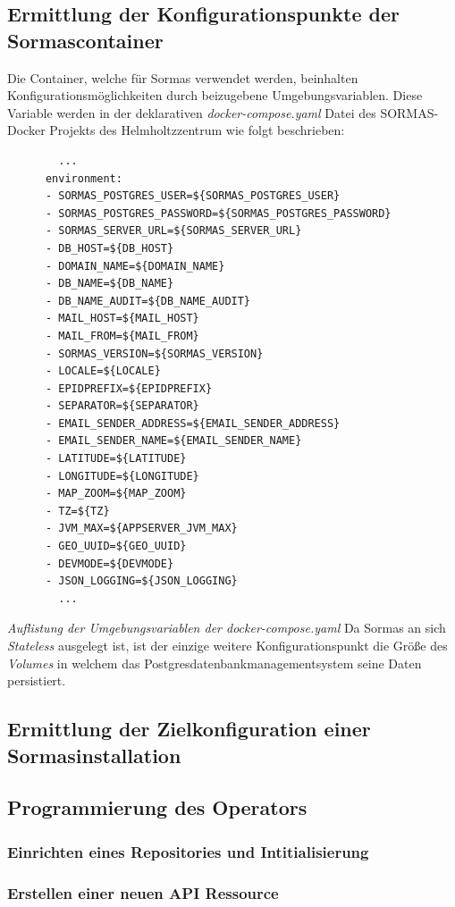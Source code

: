 \documentclass[a4paper,11pt]{article}
\begin{document}
    \subsection{Ermittlung der Konfigurationspunkte der Sormascontainer}
    Die Container, welche für Sormas verwendet werden, beinhalten Konfigurationsmöglichkeiten durch beizugebene Umgebungsvariablen.
    Diese Variable werden in der deklarativen \emph{docker-compose.yaml} Datei des SORMAS-Docker Projekts des Helmholtzzentrum wie folgt beschrieben:
    \begin{lstlisting}
        ...
      environment:
      - SORMAS_POSTGRES_USER=${SORMAS_POSTGRES_USER}
      - SORMAS_POSTGRES_PASSWORD=${SORMAS_POSTGRES_PASSWORD}
      - SORMAS_SERVER_URL=${SORMAS_SERVER_URL}
      - DB_HOST=${DB_HOST}
      - DOMAIN_NAME=${DOMAIN_NAME}
      - DB_NAME=${DB_NAME}
      - DB_NAME_AUDIT=${DB_NAME_AUDIT}
      - MAIL_HOST=${MAIL_HOST}
      - MAIL_FROM=${MAIL_FROM}
      - SORMAS_VERSION=${SORMAS_VERSION}
      - LOCALE=${LOCALE}
      - EPIDPREFIX=${EPIDPREFIX}
      - SEPARATOR=${SEPARATOR}
      - EMAIL_SENDER_ADDRESS=${EMAIL_SENDER_ADDRESS}
      - EMAIL_SENDER_NAME=${EMAIL_SENDER_NAME}
      - LATITUDE=${LATITUDE}
      - LONGITUDE=${LONGITUDE}
      - MAP_ZOOM=${MAP_ZOOM}
      - TZ=${TZ}
      - JVM_MAX=${APPSERVER_JVM_MAX}
      - GEO_UUID=${GEO_UUID}
      - DEVMODE=${DEVMODE}
      - JSON_LOGGING=${JSON_LOGGING}
        ...
    \end{lstlisting} 
    \emph{Auflistung der Umgebungsvariablen der docker-compose.yaml}
    Da Sormas an sich \emph{Stateless} ausgelegt ist, ist der einzige weitere Konfigurationspunkt
    die Größe des \emph{Volumes} in welchem  das Postgresdatenbankmanagementsystem seine Daten persistiert.
    \subsection{Ermittlung der Zielkonfiguration einer Sormasinstallation}
    \subsection{Programmierung des Operators}
      \subsubsection{Einrichten eines Repositories und Intitialisierung}
      
      \subsubsection{Erstellen einer neuen API Ressource}
\end{document}
